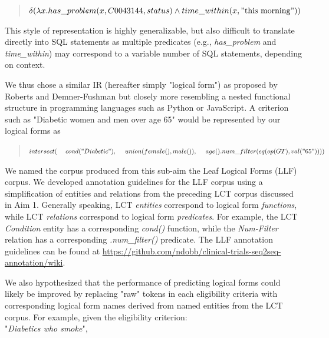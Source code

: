 \documentclass[../main.tex]{subfiles}
\begin{document}
\begin{quote}
    \centering
    $\delta( \lambda x.has\_problem(x, C0043144, status) \wedge time\_within(x, \mathrm{"this\ morning"}))$
\end{quote}

\noindent This style of representation is highly generalizable, but also difficult to translate directly into SQL statements as multiple predicates (e.g., \textit{has\_problem} and \textit{time\_within}) may correspond to a variable number of SQL statements, depending on context.

We thus chose a similar IR (hereafter simply "logical form") as proposed by Roberts and Demner-Fushman but closely more resembling a nested functional structure in programming languages such as Python or JavaScript. A criterion such as "Diabetic women and men over age 65" would be represented by our logical forms as

\begin{quote}
$intersect( \\
    \mathrm{\ \ \ \ }cond("Diabetic"), \\
    \mathrm{\ \ \ \ }union(female(), male()),\\
    \mathrm{\ \ \ \ }age().num\_filter(eq(op(GT), val("65"))) \\
)$
\end{quote}

We named the corpus produced from this sub-aim the Leaf Logical Forms (LLF) corpus. We developed annotation guidelines for the LLF corpus using a simplification of entities and relations from the preceding LCT corpus discussed in Aim 1. Generally speaking, LCT \textit{entities} correspond to logical form \textit{functions}, while LCT \textit{relations} correspond to logical form \textit{predicates}. For example, the LCT \textit{Condition} entity has a corresponding \textit{cond()} function, while the \textit{Num-Filter} relation has a corresponding \textit{.num\_filter()} predicate. The LLF annotation guidelines can be found at \url{https://github.com/ndobb/clinical-trials-seq2seq-annotation/wiki}.

We also hypothesized that the performance of predicting logical forms could likely be improved by replacing "raw" tokens in each eligibility criteria with corresponding logical form names derived from named entities from the LCT corpus. For example, given the eligibility criterion: \\

"\textit{Diabetics who smoke}", \\
\end{document}
